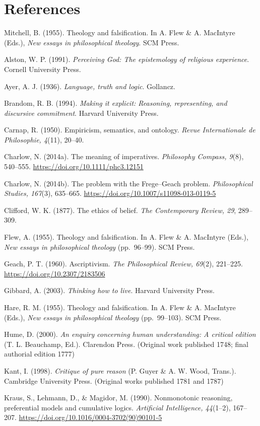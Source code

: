 \documentclass[
  11pt,
]{article}
\begin{document}
\section{References}\label{references}

Mitchell, B. (1955). Theology and falsification. In A. Flew \& A.
MacIntyre (Eds.), \emph{New essays in philosophical theology}. SCM
Press.

Alston, W. P. (1991). \emph{Perceiving God: The epistemology of
religious experience}. Cornell University Press.

Ayer, A. J. (1936). \emph{Language, truth and logic}. Gollancz.

Brandom, R. B. (1994). \emph{Making it explicit: Reasoning,
representing, and discursive commitment}. Harvard University Press.

Carnap, R. (1950). Empiricism, semantics, and ontology. \emph{Revue
Internationale de Philosophie, 4}(11), 20--40.

Charlow, N. (2014a). The meaning of imperatives. \emph{Philosophy
Compass, 9}(8), 540--555. \url{https://doi.org/10.1111/phc3.12151}

Charlow, N. (2014b). The problem with the Frege--Geach problem.
\emph{Philosophical Studies, 167}(3), 635--665.
\url{https://doi.org/10.1007/s11098-013-0119-5}

Clifford, W. K. (1877). The ethics of belief. \emph{The Contemporary
Review, 29}, 289--309.

Flew, A. (1955). Theology and falsification. In A. Flew \& A. MacIntyre
(Eds.), \emph{New essays in philosophical theology} (pp.~96--99). SCM
Press.

Geach, P. T. (1960). Ascriptivism. \emph{The Philosophical Review,
69}(2), 221--225. \url{https://doi.org/10.2307/2183506}

Gibbard, A. (2003). \emph{Thinking how to live}. Harvard University
Press.

Hare, R. M. (1955). Theology and falsification. In A. Flew \& A.
MacIntyre (Eds.), \emph{New essays in philosophical theology}
(pp.~99--103). SCM Press.

Hume, D. (2000). \emph{An enquiry concerning human understanding: A
critical edition} (T. L. Beauchamp, Ed.). Clarendon Press. (Original
work published 1748; final authorial edition 1777)

Kant, I. (1998). \emph{Critique of pure reason} (P. Guyer \& A. W. Wood,
Trans.). Cambridge University Press. (Original works published 1781 and
1787)

Kraus, S., Lehmann, D., \& Magidor, M. (1990). Nonmonotonic reasoning,
preferential models and cumulative logics. \emph{Artificial
Intelligence, 44}(1--2), 167--207.
\url{https://doi.org/10.1016/0004-3702(90)90101-5}
\end{document}
